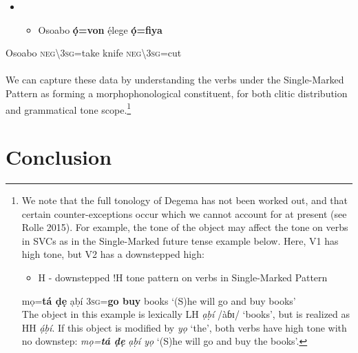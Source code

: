 \begin{itemize}
\item \setcounter{itemize}{0}
\begin{itemize}
\item \gll *Osoabo  \textbf{ọ́=von}       ẹ́lege   \textbf{ọ́=fiya}\\
\end{itemize}
\end{itemize}
     Osoabo   \textsc{neg{\textbackslash}3sg}=take   knife   \textsc{neg{\textbackslash}}3\textsc{sg}=cut\\\\
We can capture these data by understanding the verbs under the Single-Marked Pattern as forming a morphophonological constituent, for both clitic distribution and grammatical tone scope.\footnote{We note that the full tonology of Degema has not been worked out, and that certain counter-exceptions occur which we cannot account for at present (see Rolle 2015). For example, the tone of the object may affect the tone on verbs in SVCs as in the Single-Marked future tense example below. Here, V1 has high tone, but V2 has a downstepped high:

\setcounter{itemize}{0}
\begin{itemize}
\item \begin{styleNoSpacing}
H - downstepped !H tone pattern on verbs in Single-Marked Pattern
\end{styleNoSpacing}
\end{itemize}
mọ=\textbf{tá    ḍẹ }  ạḅí
3\textsc{sg}=\textbf{go  buy }  books
‘(S)he will go and buy books’ \\

The object in this example is lexically LH \textit{ạḅí }/àɓɪ/\textit{ }‘books’, but is realized as HH \textit{ạ́ḅí}. If this object is modified by \textit{yọ} ‘the’, both verbs have high tone with no downstep: \textit{mọ=}\textbf{\textit{tá ḍẹ }}\textit{ạḅí yọ} ‘(S)he will go and buy the books’. }

\chapter{Conclusion}

